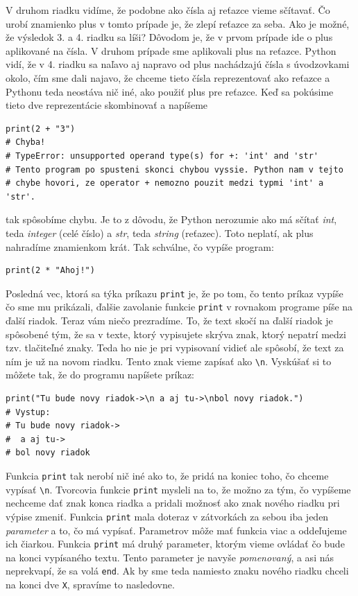 \documentclass{article}
\begin{document}
V druhom riadku vidíme, že podobne ako čísla aj reťazce vieme sčítavať. Čo urobí znamienko plus v tomto prípade je, že zlepí reťazce za seba. Ako je možné, že výsledok 3. a 4. riadku sa líši? Dôvodom je, že v prvom prípade ide o plus aplikované na čísla. V druhom prípade sme aplikovali plus na reťazce. Python vidí, že v 4. riadku sa naľavo aj napravo od plus nachádzajú čísla s úvodzovkami okolo, čím sme dali najavo, že chceme tieto čísla reprezentovať ako reťazce a Pythonu teda neostáva nič iné, ako použiť plus pre reťazce. Keď sa pokúsime tieto dve reprezentácie skombinovať a 
napíšeme

\begin{lstlisting}
print(2 + "3")
# Chyba! 
# TypeError: unsupported operand type(s) for +: 'int' and 'str'
# Tento program po spusteni skonci chybou vyssie. Python nam v tejto
# chybe hovori, ze operator + nemozno pouzit medzi typmi 'int' a 'str'.
\end{lstlisting}

tak spôsobíme chybu. Je to z dôvodu, že Python nerozumie ako má sčítať \textit{int}, teda \textit{integer} (celé číslo) a \textit{str}, teda \textit{string} (reťazec). Toto neplatí, ak plus nahradíme znamienkom krát. Tak schválne, čo vypíše program:

\begin{lstlisting}
print(2 * "Ahoj!")
\end{lstlisting}

Posledná vec, ktorá sa týka príkazu \texttt{print} je, že po tom, čo tento príkaz vypíše čo sme mu prikázali, ďalšie zavolanie funkcie \texttt{print} v rovnakom programe píše na ďalší riadok. Teraz vám niečo prezradíme. To, že text skočí na ďalší riadok je spôsobené tým, že sa v texte, ktorý vypisujete skrýva znak, ktorý nepatrí medzi tzv. tlačiteľné znaky. Teda ho nie je pri vypisovaní vidieť ale spôsobí, že text za ním je už na novom riadku. Tento znak vieme zapísať ako \texttt{\textbackslash n}. Vyskúšať si to môžete tak, že do programu napíšete príkaz:

\begin{lstlisting}
print("Tu bude novy riadok->\n a aj tu->\nbol novy riadok.")
# Vystup:
# Tu bude novy riadok->
#  a aj tu->
# bol novy riadok
\end{lstlisting}

Funkcia \texttt{print} tak nerobí nič iné ako to, že pridá na koniec toho, čo chceme vypísať \texttt{\textbackslash n}. Tvorcovia funkcie \texttt{print} mysleli na to, že možno za tým, čo vypíšeme nechceme dať znak konca riadka a pridali možnosť ako znak nového riadku pri výpise zmeniť. Funkcia \texttt{print} mala doteraz v zátvorkách za sebou iba jeden \textit{parameter} a to, čo má vypísať. Parametrov môže mať funkcia viac a oddeľujeme ich čiarkou. Funkcia \texttt{print} má druhý parameter, ktorým vieme ovládať čo bude na konci vypísaného textu. Tento parameter je navyše \textit{pomenovaný}, a asi nás neprekvapí, že sa volá \texttt{end}. Ak by sme teda namiesto znaku nového riadku chceli na konci dve \texttt{X}, spravíme to nasledovne.
\end{document}

